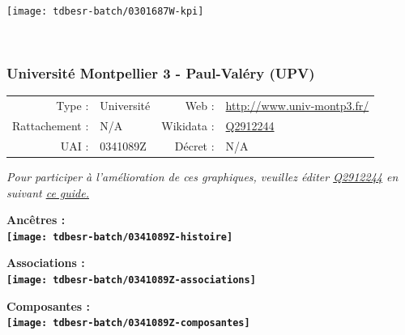 \documentclass[12pt,french,]{article}
\begin{document}
\begin{center}\texttt{[image: tdbesr-batch/0301687W-kpi]} \end{center}\checkoddpage

\ifoddpage ~\newpage \fi   

\hypertarget{universituxe9-montpellier-3---paul-valuxe9ry-upv}{%
\subsubsection{Université Montpellier 3 - Paul-Valéry
(UPV)}\label{universituxe9-montpellier-3---paul-valuxe9ry-upv}}

\begin{tabular*}{\textwidth}{rp{5cm}rl}  
\hline  
Type : & Université & Web : &\href{http://www.univ-montp3.fr/}{http://www.univ-montp3.fr/} \\  
Rattachement : & N/A & Wikidata : & \href{https://www.wikidata.org/entity/Q2912244}{Q2912244} \\  
UAI : & 0341089Z & Décret : & N/A \\  
\hline  
\end{tabular*}

\textit{\scriptsize Pour participer à l'amélioration de ces graphiques, veuillez éditer  \href{https://www.wikidata.org/entity/Q2912244}{Q2912244}  en suivant \href{https://github.com/cpesr/wikidataESR/blob/master/Rmd/wikidataESR.md}{ce guide.}}

\vspace{1cm}  
\begin{minipage}[b]{0.50\textwidth}\begin{center} \bf Ancêtres : \\  
\texttt{[image: tdbesr-batch/0341089Z-histoire]} \end{center}\end{minipage}\begin{minipage}[b]{0.50\textwidth}\begin{center} \bf Associations : \\  
\texttt{[image: tdbesr-batch/0341089Z-associations]} \end{center}\end{minipage}

\hrulefill

\begin{center} \bf Composantes : \\  
\texttt{[image: tdbesr-batch/0341089Z-composantes]} \end{center}
\end{document}

